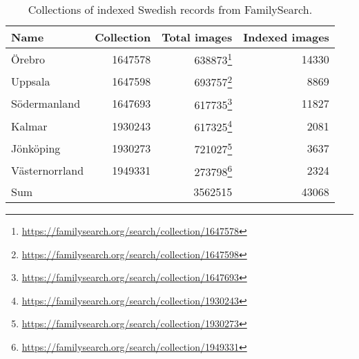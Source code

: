 \begin{table}
\centering
\begin{tabular}{ l | r r r}
Name & Collection & Total images & Indexed images \\
\hline
Örebro	& 1647578	& 638873\footnote{\url{https://familysearch.org/search/collection/1647578}}	& 14330 \\
Uppsala	& 1647598	& 693757\footnote{\url{https://familysearch.org/search/collection/1647598}}	& 8869 \\
Södermanland	& 1647693	& 617735\footnote{\url{https://familysearch.org/search/collection/1647693}}	& 11827 \\
Kalmar	& 1930243	& 617325\footnote{\url{https://familysearch.org/search/collection/1930243}}	& 2081 \\
Jönköping	& 1930273	& 721027\footnote{\url{https://familysearch.org/search/collection/1930273}}	& 3637 \\
Västernorrland	& 1949331	& 273798\footnote{\url{https://familysearch.org/search/collection/1949331}}	& 2324 \\
\hline
Sum & & 3562515 & 43068
\end{tabular}
\caption{Collections of indexed Swedish records from FamilySearch.}
\label{tab:collections}
\end{table}
